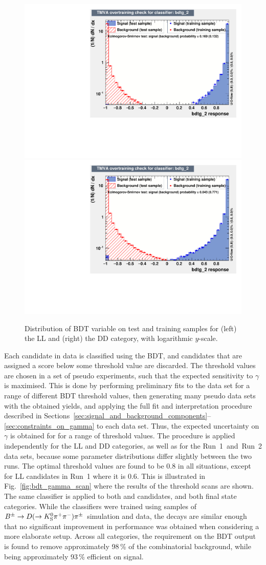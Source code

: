 \begin{figure}[tb]
    \centering
    \includegraphics[width=0.45\columnwidth]{figures/analysis/overtrain_check_LL.pdf}
    \includegraphics[width=0.45\columnwidth]{figures/analysis/overtrain_check_DD.pdf}
    \caption{Distribution of BDT variable on test and training samples for (left) the LL and (right) the DD category, with logarithmic $y$-scale.}
    \label{fig:overtrain}
\end{figure}

Each candidate in data is classified using the BDT, and candidates that are assigned a score below some threshold value are discarded. The threshold values are chosen in a set of pseudo experiments, such that the expected sensitivity to $\gamma$ is maximised. This is done by performing preliminary fits to the data set for a range of different BDT threshold values, then generating many pseudo data sets with the obtained yields, and applying the full fit and interpretation procedure described in Sections~\ref{sec:signal_and_background_components}--\ref{sec:constraints_on_gamma} to each data set. Thus, the expected uncertainty on $\gamma$ is obtained for for a range of threshold values. The procedure is applied independently for the LL and DD categories, as well as for the Run~1~and~Run~2 data sets, because some parameter distributions differ slightly between the two runs. The optimal threshold values are found to be 0.8 in all situations, except for LL candidates in Run~1 where it is 0.6. This is illustrated in Fig.~\ref{fig:bdt_gamma_scan} where the results of the threshold scans are shown. The same classifier is applied to both \BtoDpi and \BtoDK candidates, and both \D final state categories. While the classifiers were trained using samples of ${{B}^\pm}\rightarrow{\ensuremath{D}}(\rightarrow{\ensuremath{{K}^0_{\mathrm{S}}}}{\ensuremath{{\pi}^+}}{\ensuremath{{\pi}^-}}){{\pi}^\pm}$ simulation and data, the decays are similar enough that no significant improvement in performance was obtained when considering a more elaborate setup. Across all categories, the requirement on the BDT output is found to remove approximately 98\,\% of the combinatorial background, while being approximately 93\,\% efficient on signal.

